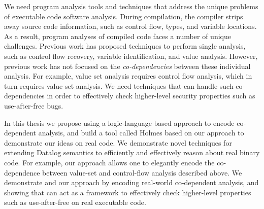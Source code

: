 We need program analysis tools and techniques that address the unique problems of executable code software analysis.
During compilation, the compiler strips away source code information, such as control flow, types, and variable locations.
As a result, program analyses of compiled code faces a number of unique challenges.
Previous work has proposed techniques to perform single analysis, such as control flow recovery, variable identification, and value analysis.
However, previous work has not focused on the \emph{co-dependencies} between these individual analysis.
For example, value set analysis requires control flow analysis, which in turn requires value set
analysis.
We need techniques that can handle such co-dependencies in order to effectively check higher-level security properties such as use-after-free bugs.

In this thesis we propose using a logic-language based approach to encode co-dependent analysis, and build a tool called Holmes based on our approach to demonstrate our ideas on real code.
We demonstrate novel techniques for extending Datalog semantics to efficiently and effectively reason about real binary code.
For example, our approach allows one to elegantly encode the co-dependence between value-set and control-flow analysis described above.
We demonstrate {\sysname} and our approach by encoding real-world co-dependent analysis, and showing that {\sysname} can act as a framework to effectively check higher-level properties such as use-after-free on real executable code.
